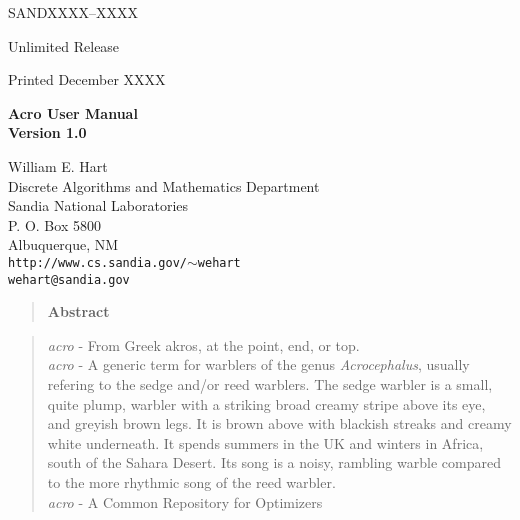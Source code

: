 \documentclass[11pt]{article}
\begin{document}
\lhead{}
\rhead{}
\rfoot{}
\lfoot{}
\cfoot{}
\chead{}


\begin{center}
SANDXXXX--XXXX

Unlimited Release

Printed December XXXX
\end{center}

\vspace{0.8in}

\begin{center}
{\bf \LARGE Acro User Manual\\
[1ex]\Large Version 1.0}
\vspace*{0.4in}

William E. Hart\\
Discrete Algorithms and Mathematics Department\\
Sandia National Laboratories\\
P. O. Box 5800\\
Albuquerque, NM\\
{\tt http://www.cs.sandia.gov/$\sim$wehart}\\
{\tt wehart@sandia.gov}\\
\end{center}

\vspace*{1.0in}

\begin{quote}
{\bf\large Abstract}

\end{quote}

\vfill
\newpage

\pagestyle{fancy}
\begin{quote}
{\em acro} - From Greek akros, at the point, end, or top.\\

{\em acro} - A generic term for warblers of the genus {\em Acrocephalus}, usually refering to the sedge and/or reed warblers. The sedge warbler is a small, quite plump, warbler with a striking broad creamy stripe above its eye, and greyish brown legs. It is brown above with blackish streaks and creamy white underneath. It spends summers in the UK and winters in Africa, south of the Sahara Desert. Its song is a noisy, rambling warble compared to the more rhythmic song of the reed warbler.\\

{\em acro} - A Common Repository for Optimizers
\end{quote}

\vfill
\newpage



\clearemptydoublepage
{}
\setcounter{page}{3}
\cfoot{\thepage}




%
%
\end{document}
